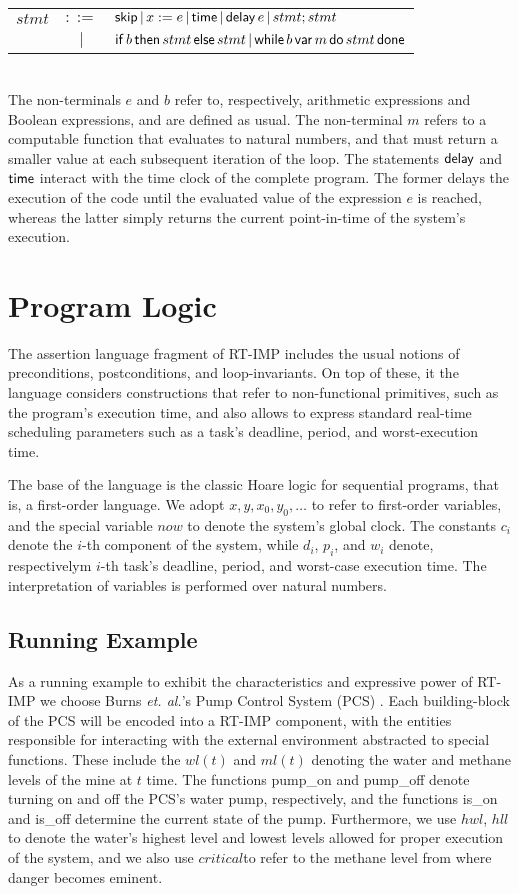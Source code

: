\documentclass{llncs}
\begin{document}
\begin{tabular}{rcl}
$stmt$ & $::=$ & ${\sf skip}\,|\,x := e\,|\,{\sf time}\,|\,{\sf delay}\,e\,|\,stmt;stmt$\\
& $|$ & ${\sf if}\,b\,{\sf then}\,stmt\,{\sf else}\,stmt\,|\,{\sf while}\,b\,{\sf var}\,m\,{\sf do}\,stmt\,{\sf done}$
\end{tabular}\\

The non-terminals $e$ and $b$ refer to, respectively, arithmetic expressions and Boolean expressions, and are defined as usual. The non-terminal $m$ refers to a computable function that evaluates to natural numbers, and that must return a smaller value at each subsequent iteration of the loop. The statements ${\sf delay}$ and ${\sf time}$ interact with the time clock of the complete program. The former delays the execution of the code until the evaluated value of the expression $e$ is reached, whereas the latter simply returns the current point-in-time of the system's execution.

\section{Program Logic}

The assertion language fragment of RT-IMP includes the usual notions of preconditions, postconditions, and loop-invariants. On top of these, it the language considers constructions that refer to non-functional primitives, such as the program's execution time, and also allows to express standard real-time scheduling parameters such as a task's deadline, period, and worst-execution time.

The base of the language is the classic Hoare logic for sequential programs, that is, a first-order language. We adopt $x,y,x_0,y_0,\ldots$ to refer to first-order variables, and the special variable $now$ to denote the system's global clock. The constants $c_i$ denote the $i$-th component of the system, while $d_i$, $p_i$, and $w_i$ denote, respectivelym $i$-th task's deadline, period, and worst-case execution time. The interpretation of variables is performed over natural numbers.


\subsection{Running Example}

As a running example to exhibit the characteristics and expressive power of RT-IMP we choose Burns {\sl et. al.}'s Pump Control System (PCS) \cite{}. Each building-block of the PCS will be encoded into a RT-IMP component, with the entities responsible for interacting with the external environment abstracted to special functions. These include the $wl(t)$ and $ml(t)$ denoting the water and methane levels of the mine at $t$ time. The functions {\sf pump\_on} and {\sf pump\_off} denote turning on and off the PCS's water pump, respectively, and the functions {\sf is\_on} and {\sf is\_off} determine the current state of the pump. Furthermore, we use $hwl$, $hll$ to denote the water's highest level and lowest levels allowed for proper execution of the system, and we also use $critical$to refer to the methane level from where danger becomes eminent.  
\end{document}
